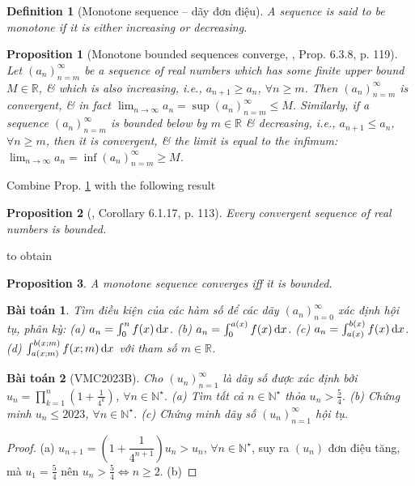 \documentclass{article}
\newtheorem{baitoan}{Bài toán}
\newtheorem{definition}{Definition}
\newtheorem{proposition}{Proposition}
\begin{document}
\begin{definition}[Monotone sequence -- dãy đơn điệu]
	A sequence is said to be {\rm monotone} if it is either increasing or decreasing.
\end{definition}

\begin{proposition}[Monotone bounded sequences converge, \cite{Tao_analysis_1}, Prop. 6.3.8, p. 119]
	\label{prop: monotone bounded sequences converge}
	Let $(a_n)_{n=m}^\infty$ be a sequence of real numbers which has some finite upper bound $M\in\mathbb{R}$, \& which is also increasing, i.e., $a_{n+1}\ge a_n$, $\forall n\ge m$. Then $(a_n)_{n=m}^\infty$ is convergent, \& in fact $\lim_{n\to\infty} a_n = \sup(a_n)_{n=m}^\infty\le M$. Similarly, if a sequence $(a_n)_{n=m}^\infty$ is bounded below by $m\in\mathbb{R}$ \& decreasing, i.e., $a_{n+1}\le a_n$, $\forall n\ge m$, then it is convergent, \& the limit is equal to the infimum: $\lim_{n\to\infty} a_n = \inf(a_n)_{n=m}^\infty\ge M$.
\end{proposition}
Combine Prop. \ref{prop: monotone bounded sequences converge} with the following result
\begin{proposition}[\cite{Tao_analysis_1}, Corollary 6.1.17, p. 113]
	Every convergent sequence of real numbers is bounded.
\end{proposition}
to obtain
\begin{proposition}
	A monotone sequence converges iff it is bounded.
\end{proposition}

\begin{baitoan}
	Tìm điều kiện của các hàm số để các dãy $(a_n)_{n=0}^\infty$ xác định hội tụ, phân kỳ: (a) $a_n = \int_0^n f(x)\,{\rm d}x$. (b) $a_n = \int_0^{a(x)} f(x)\,{\rm d}x$. (c) $a_n = \int_{a(x)}^{b(x)} f(x)\,{\rm d}x$. (d) $\int_{a(x;m)}^{b(x;m)} f(x;m)\,{\rm d}x$ với tham số $m\in\mathbb{R}$.
\end{baitoan}

\begin{baitoan}[VMC2023B]
	Cho $(u_n)_{n=1}^\infty$ là dãy số được xác định bởi $u_n = \prod_{k=1}^n \left(1 + \frac{1}{4^k}\right)$, $\forall n\in\mathbb{N}^\star$. (a) Tìm tất cả $n\in\mathbb{N}^\star$ thỏa $u_n > \frac{5}{4}$. (b) Chứng minh $u_n\le2023$, $\forall n\in\mathbb{N}^\star$. (c) Chứng minh dãy số $(u_n)_{n=1}^\infty$ hội tụ.
\end{baitoan}

\begin{proof}
	(a) $u_{n+1} = \left(1 + \dfrac{1}{4^{n+1}}\right)u_n > u_n$, $\forall n\in\mathbb{N}^\star$, suy ra $(u_n)$ đơn điệu tăng, mà $u_1 = \frac{5}{4}$ nên $u_n > \frac{5}{4}\Leftrightarrow n\ge2$. (b)
\end{proof}
\end{document}
